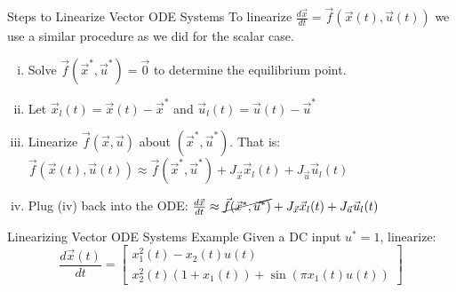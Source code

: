 \documentclass{beamer}
\begin{document}
	\begin{frame}{Steps to Linearize Vector ODE Systems}
	To linearize $\frac{d\vec{x}}{dt} = \vec{f}(\vec{x}(t), \vec{u}(t))$ we use a similar procedure as we did for the scalar case. \pause 
	\begin{enumerate}[(i)]
	    \item Solve $\vec{f}(\vec{x}^*, \vec{u}^*) = \vec{0}$ to determine the equilibrium point. \pause \\
	    \item Let $\vec{x}_l(t) = \vec{x}(t) - \vec{x}^*$ and $\vec{u}_l(t) = \vec{u}(t) - \vec{u}^*$ \pause \\
	    \item Linearize $\vec{f}(\vec{x}, \vec{u})$ about $(\vec{x}^*, \vec{u}^*)$. That is: $\vec{f}(\vec{x}(t), \vec{u}(t)) \approx \vec{f}(\vec{x}^*, \vec{u}^*) + J_{\vec{x}}\vec{x}_l(t) + J_{\vec{u}}\vec{u}_l(t)$ \pause \\
	    \item Plug (iv) back into the ODE: $\frac{d\vec{x}}{dt} \approx \cancel{\vec{f}(\vec{x}^*, \vec{u}^*)} + J_{\vec{x}}\vec{x}_l(t) + J_{\vec{u}}\vec{u}_l(t)$
	\end{enumerate}

	\end{frame}

	\begin{frame}{Linearizing Vector ODE Systems Example}
	    Given a DC input $u^* = 1$, linearize: 
	    \[
	    \frac{d\vec{x}(t)}{dt} = \begin{bmatrix}
	    x_1^2(t) - x_2(t)u(t)\\
	    x_2^2(t)(1 + x_1(t)) + \sin(\pi x_1(t)u(t))
	    \end{bmatrix}
	    \]
	    
	\end{frame}
\end{document}
